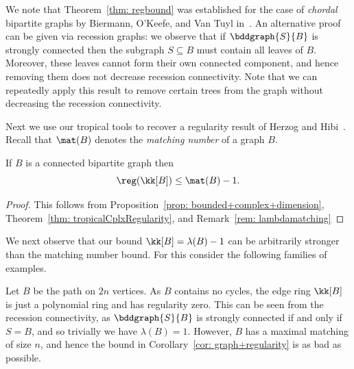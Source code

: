 We note that Theorem~\ref{thm: regbound} was established for the case of \emph{chordal} bipartite graphs by Biermann, O'Keefe, and Van Tuyl in~\cite{BieOkeVan17}.
An alternative proof can be given via recession graphs: we observe that if $\bddgraph{S}{B}$ is strongly connected then the subgraph $S \subseteq B$ must contain all leaves of $B$.
Moreover, these leaves cannot form their own connected component, and hence removing them does not decrease recession connectivity.
Note that we can repeatedly apply this result to remove certain trees from the graph without decreasing the recession connectivity.

Next we use our tropical tools to recover a regularity result of Herzog and Hibi~\cite{herzog2020regularity}.  Recall that $\mat(B)$ denotes the \emph{matching number} of a graph $B$.

\begin{cor}\cite[Theorem 1]{herzog2020regularity} \label{cor: matching}
 If $B$ is a connected bipartite graph then
\[\reg(\kk[B]) \leq \mat(B) - 1.\]
\end{cor}

\begin{proof}
This follows from Proposition~\ref{prop: bounded+complex+dimension}, Theorem~\ref{thm: tropicalCplxRegularity}, and Remark~\ref{rem: lambdamatching}
\end{proof}


We next observe that our bound $\kk[B] = \lambda(B) - 1$ can be arbitrarily stronger than the matching number bound.  For this consider the following families of examples.

\begin{example} \label{ex: path+regularity}
Let $B$ be the path on $2n$ vertices.
As $B$ contains no cycles, the edge ring $\kk[B]$ is just a polynomial ring and has regularity zero.
This can be seen from the recession connectivity, as $\bddgraph{S}{B}$ is strongly connected if and only if $S = B$, and so trivially we have $\lambda(B)=1$.
However, $B$ has a maximal matching of size $n$, and hence the bound in Corollary~\ref{cor: graph+regularity} is as bad as possible.
\end{example}

